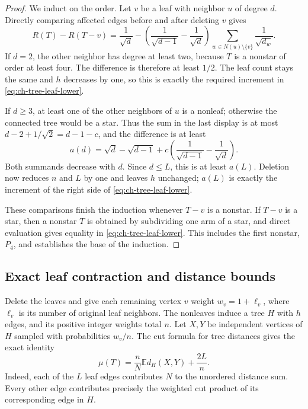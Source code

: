 \documentclass[11pt,a4paper]{article}
\theoremstyle{remark}
\numberwithin{equation}{section}
\begin{document}
\begin{proof}
We induct on the order. Let $v$ be a leaf with neighbor $u$ of degree
$d$. Directly comparing affected edges before and after deleting $v$
gives
\[
 R(T)-R(T-v)=\frac1{\sqrt d}
 -\left(\frac1{\sqrt{d-1}}-\frac1{\sqrt d}\right)
          \sum_{w\in N(u)\setminus\{v\}}\frac1{\sqrt{d_w}}.
\]
If $d=2$, the other neighbor has degree at least two, because $T$ is a
nonstar of order at least four. The difference is therefore at least
$1/2$. The leaf count stays the same and $h$ decreases by one, so this
is exactly the required increment in \eqref{eq:ch-tree-leaf-lower}.

If $d\ge3$, at least one of the other neighbors of $u$ is a nonleaf;
otherwise the connected tree would be a star. Thus the sum in the last
display is at most $d-2+1/\sqrt2=d-1-c$, and the difference is at least
\[
 a(d)=\sqrt d-\sqrt{d-1}
          +c\left(\frac1{\sqrt{d-1}}-\frac1{\sqrt d}\right).
\]
Both summands decrease with $d$. Since $d\le L$, this is at least
$a(L)$. Deletion now reduces $n$ and $L$ by one and leaves $h$ unchanged;
$a(L)$ is exactly the increment of the right side of
\eqref{eq:ch-tree-leaf-lower}.

These comparisons finish the induction whenever $T-v$ is a nonstar.
If $T-v$ is a star, then a nonstar $T$ is obtained by subdividing one arm
of a star, and direct evaluation gives equality in
\eqref{eq:ch-tree-leaf-lower}. This includes the first nonstar, $P_4$,
and establishes the base of the induction.
\end{proof}

\subsection{Exact leaf contraction and distance bounds}

Delete the leaves and give each remaining vertex $v$ weight
$w_v=1+\ell_v$, where $\ell_v$ is its number of original leaf neighbors.
The nonleaves induce a tree $H$ with $h$ edges, and its positive integer
weights total $n$. Let $X,Y$ be independent vertices of $H$ sampled with
probabilities $w_v/n$. The cut formula for tree distances gives the exact
identity
\begin{equation}\label{eq:ch-tree-leaf-contraction}
 \mu(T)=\frac nN\mathbb E d_H(X,Y)+\frac{2L}{n}.
\end{equation}
Indeed, each of the $L$ leaf edges contributes $N$ to the unordered
distance sum. Every other edge contributes precisely the weighted cut
product of its corresponding edge in $H$.
\end{document}
